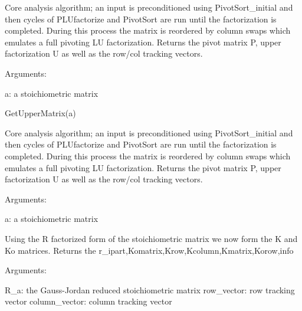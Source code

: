 \documentclass[a4paper,11pt,english]{sphinxmanual}
\begin{document}
\begin{fulllineitems}
\begin{fulllineitems}
\label{modules_doc:cbmpy.PyscesStoich.Stoich.GetUpperMatrix}
Core analysis algorithm; an input is preconditioned using PivotSort\_initial and then cycles of PLUfactorize and
PivotSort are run until the factorization is completed. During this process the matrix is reordered by
column swaps which emulates a full pivoting LU factorization. Returns the pivot matrix P, upper factorization U
as well as the row/col tracking vectors.

Arguments:

a: a stoichiometric matrix

\end{fulllineitems}


\begin{fulllineitems}
\label{modules_doc:cbmpy.PyscesStoich.Stoich.GetUpperMatrixUsingQR}
GetUpperMatrix(a)

Core analysis algorithm; an input is preconditioned using PivotSort\_initial and then cycles of PLUfactorize and
PivotSort are run until the factorization is completed. During this process the matrix is reordered by
column swaps which emulates a full pivoting LU factorization. Returns the pivot matrix P, upper factorization U
as well as the row/col tracking vectors.

Arguments:

a: a stoichiometric matrix

\end{fulllineitems}


\begin{fulllineitems}
\label{modules_doc:cbmpy.PyscesStoich.Stoich.K_split_R}
Using the R factorized form of the stoichiometric matrix we now form the K and Ko matrices. Returns
the r\_ipart,Komatrix,Krow,Kcolumn,Kmatrix,Korow,info

Arguments:

R\_a: the Gauss-Jordan reduced stoichiometric matrix
row\_vector: row tracking vector
column\_vector: column tracking vector

\end{fulllineitems}


\end{fulllineitems}
\end{document}
